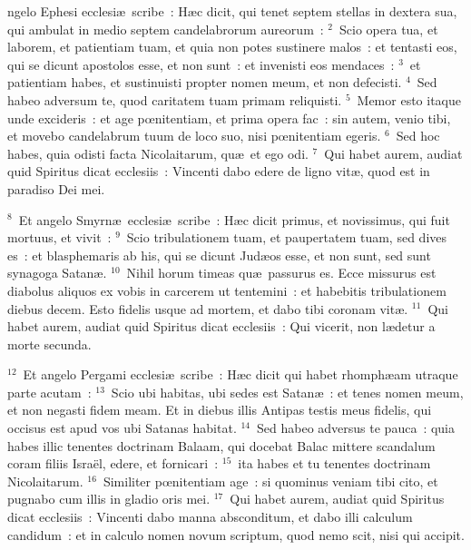 \bchapter
{}ngelo Ephesi ecclesi\ae\ scribe~: H\ae c dicit, qui tenet septem stellas in dextera sua, qui ambulat in medio septem candelabrorum aureorum~:
${}^{2}$~Scio opera tua, et laborem, et patientiam tuam, et quia non potes sustinere malos~: et tentasti eos, qui se dicunt apostolos esse, et non sunt~: et invenisti eos mendaces~:
${}^{3}$~et patientiam habes, et sustinuisti propter nomen meum, et non defecisti.
${}^{4}$~Sed habeo adversum te, quod caritatem tuam primam reliquisti.
${}^{5}$~Memor esto itaque unde excideris~: et age pœnitentiam, et prima opera fac~: sin autem, venio tibi, et movebo candelabrum tuum de loco suo, nisi pœnitentiam egeris.
${}^{6}$~Sed hoc habes, quia odisti facta Nicolaitarum, qu\ae\ et ego odi.
${}^{7}$~Qui habet aurem, audiat quid Spiritus dicat ecclesiis~: Vincenti dabo edere de ligno vit\ae , quod est in paradiso Dei mei.


${}^{8}$~Et angelo Smyrn\ae\ ecclesi\ae\ scribe~: H\ae c dicit primus, et novissimus, qui fuit mortuus, et vivit~:
${}^{9}$~Scio tribulationem tuam, et paupertatem tuam, sed dives es~: et blasphemaris ab his, qui se dicunt Jud\ae os esse, et non sunt, sed sunt synagoga Satan\ae .
${}^{10}$~Nihil horum timeas qu\ae\ passurus es. Ecce missurus est diabolus aliquos ex vobis in carcerem ut tentemini~: et habebitis tribulationem diebus decem. Esto fidelis usque ad mortem, et dabo tibi coronam vit\ae .
${}^{11}$~Qui habet aurem, audiat quid Spiritus dicat ecclesiis~: Qui vicerit, non l\ae detur a morte secunda.


${}^{12}$~Et angelo Pergami ecclesi\ae\ scribe~: H\ae c dicit qui habet rhomph\ae am utraque parte acutam~:
${}^{13}$~Scio ubi habitas, ubi sedes est Satan\ae~: et tenes nomen meum, et non negasti fidem meam. Et in diebus illis Antipas testis meus fidelis, qui occisus est apud vos ubi Satanas habitat.
${}^{14}$~Sed habeo adversus te pauca~: quia habes illic tenentes doctrinam Balaam, qui docebat Balac mittere scandalum coram filiis Isra\"el, edere, et fornicari~:
${}^{15}$~ita habes et tu tenentes doctrinam Nicolaitarum.
${}^{16}$~Similiter pœnitentiam age~: si quominus veniam tibi cito, et pugnabo cum illis in gladio oris mei.
${}^{17}$~Qui habet aurem, audiat quid Spiritus dicat ecclesiis~: Vincenti dabo manna absconditum, et dabo illi calculum candidum~: et in calculo nomen novum scriptum, quod nemo scit, nisi qui accipit.


